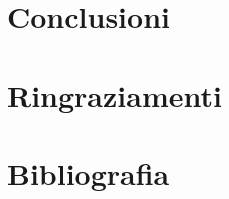 \documentclass[a4paper,12pt]{book}
\begin{document}
\chapter{Conclusioni} %
\label{chapter:quarto} %

\clearpage{\pagestyle{plain}\cleardoublepage} %
\chapter*{Ringraziamenti} %
\label{chapter:ring} %


\pagestyle{plain}
\cleardoublepage
\chapter*{Bibliografia} %
\printbibliography[heading=none]
\end{document}
